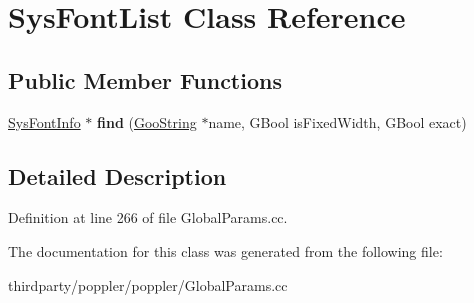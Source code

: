 \hypertarget{class_sys_font_list}{}\section{Sys\+Font\+List Class Reference}
\label{class_sys_font_list}
\subsection*{Public Member Functions}
\begin{DoxyCompactItemize}
\item 
\mbox{\label{class_sys_font_list_a7ad7f89f6cebadda4869f8513ef72e9e}} 
\hyperlink{class_sys_font_info}{Sys\+Font\+Info} $\ast$ {\bfseries find} (\hyperlink{class_goo_string}{Goo\+String} $\ast$name, G\+Bool is\+Fixed\+Width, G\+Bool exact)
\end{DoxyCompactItemize}


\subsection{Detailed Description}


Definition at line 266 of file Global\+Params.\+cc.



The documentation for this class was generated from the following file\+:\begin{DoxyCompactItemize}
\item 
thirdparty/poppler/poppler/Global\+Params.\+cc\end{DoxyCompactItemize}
